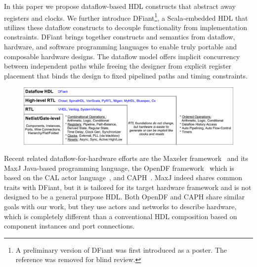 In this paper we propose dataflow-based HDL constructs that abstract away registers and clocks. We further introduce DFiant\footnote{A preliminary version of DFiant was first introduced as a poster. The reference was removed for blind review.}, a Scala-embedded HDL that utilizes these dataflow constructs to decouple functionality from implementation constraints. DFiant brings together constructs and semantics from dataflow\cite{le1986signal, Thuau1991, gurd1985manchester, arvind1992id}, hardware, and software programming languages to enable truly portable and composable hardware designs. The dataflow model offers implicit concurrency between independent paths while freeing the designer from explicit register placement that binds the design to fixed pipelined paths and timing constraints.  

\begin{figure}[t]
	\centering
	\captionsetup{justification=centering}
	\includegraphics[width=\linewidth]{graphics/motivation.pdf} 
	\label{fig:motivation}
\end{figure}

Recent related dataflow-for-hardware efforts are the Maxeler framework~\cite{Pell2011} and its MaxJ Java-based programming language, the OpenDF framework~\cite{bhattacharyya2008opendf} which is based on the CAL actor language~\cite{eker2003cal}, and CAPH~\cite{serot2011implementing}. MaxJ indeed shares common traits with DFiant, but it is tailored for its target hardware framework and is not designed to be a general purpose HDL. Both OpenDF and CAPH share similar goals with our work, but they use actors and networks to describe hardware, which is completely different than a conventional HDL composition based on component instances and port connections.

